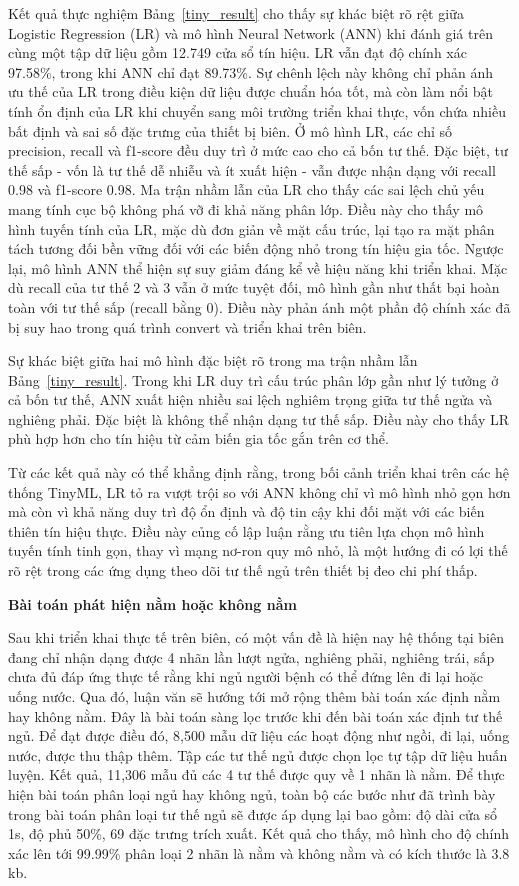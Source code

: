 Kết quả thực nghiệm Bảng~\ref{tiny_result} cho thấy sự khác biệt rõ rệt giữa
Logistic Regression (LR) và mô hình Neural Network (ANN) khi đánh giá trên cùng
một tập dữ liệu gồm 12.749 cửa sổ tín hiệu. LR vẫn đạt độ chính xác 97.58\%,
trong khi ANN chỉ đạt 89.73\%. Sự chênh lệch này không chỉ phản ánh ưu thế của
LR trong điều kiện dữ liệu được chuẩn hóa tốt, mà còn làm nổi bật tính ổn định
của LR khi chuyển sang môi trường triển khai thực, vốn chứa nhiều bất định và
sai số đặc trưng của thiết bị biên. Ở mô hình LR, các chỉ số precision, recall
và f1-score đều duy trì ở mức cao cho cả bốn tư thế. Đặc biệt, tư thế sấp - vốn
là tư thế dễ nhiễu và ít xuất hiện - vẫn được nhận dạng với recall 0.98 và
f1-score 0.98. Ma trận nhầm lẫn của LR cho thấy các sai lệch chủ yếu mang tính
cục bộ không phá vỡ đi khả năng phân lớp. Điều này cho thấy mô hình tuyến tính
của LR, mặc dù đơn giản về mặt cấu trúc, lại tạo ra mặt phân tách tương đối bền
vững đối với các biến động nhỏ trong tín hiệu gia tốc. Ngược lại, mô hình ANN
thể hiện sự suy giảm đáng kể về hiệu năng khi triển khai. Mặc dù recall của tư
thế 2 và 3 vẫn ở mức tuyệt đối, mô hình gần như thất bại hoàn toàn với tư thế
sấp (recall bằng 0). Điều này phản ánh một phần độ chính xác đã bị suy hao
trong quá trình convert và triển khai trên biên.

Sự khác biệt giữa hai mô hình đặc biệt rõ trong ma trận nhầm lẫn
Bảng~\ref{tiny_result}. Trong khi LR duy trì cấu trúc phân lớp gần như lý tưởng
ở cả bốn tư thế, ANN xuất hiện nhiều sai lệch nghiêm trọng giữa tư thế ngửa và
nghiêng phải. Đặc biệt là không thể nhận dạng tư thế sấp. Điều này cho thấy LR
phù hợp hơn cho tín hiệu từ cảm biến gia tốc gắn trên cơ thể.

Từ các kết quả này có thể khẳng định rằng, trong bối cảnh triển khai trên các
hệ thống TinyML, LR tỏ ra vượt trội so với ANN không chỉ vì mô hình nhỏ gọn hơn
mà còn vì khả năng duy trì độ ổn định và độ tin cậy khi đối mặt với các biến
thiên tín hiệu thực. Điều này củng cố lập luận rằng ưu tiên lựa chọn mô hình
tuyến tính tinh gọn, thay vì mạng nơ-ron quy mô nhỏ, là một hướng đi có lợi thế
rõ rệt trong các ứng dụng theo dõi tư thế ngủ trên thiết bị đeo chi phí thấp.

\textbf{Bài toán phát hiện nằm hoặc không nằm}

Sau khi triển khai thực tế trên biên, có một vấn đề là hiện nay hệ thống tại
biên đang chỉ nhận dạng được 4 nhãn lần lượt ngửa, nghiêng phải, nghiêng trái,
sấp chưa đủ đáp ứng thực tế rằng khi ngủ người bệnh có thể đứng lên đi lại hoặc
uống nước. Qua đó, luận văn sẽ hướng tới mở rộng thêm bài toán xác định nằm hay
không nằm. Đây là bài toán sàng lọc trước khi đến bài toán xác định tư thế ngủ.
Để đạt được điều đó, 8,500 mẫu dữ liệu các hoạt động như ngồi, đi lại, uống
nước, được thu thập thêm. Tập các tư thế ngủ được chọn lọc tự tập dữ liệu huấn
luyện. Kết quả, 11,306 mẫu đủ các 4 tư thế được quy về 1 nhãn là nằm. Để thực
hiện bài toán phân loại ngủ hay không ngủ, toàn bộ các bước như đã trình bày
trong bài toán phân loại tư thế ngủ sẽ được áp dụng lại bao gồm: độ dài cửa sổ
1s, độ phủ 50\%, 69 đặc trưng trích xuất. Kết quả cho thấy, mô hình cho độ
chính xác lên tới 99.99\% phân loại 2 nhãn là nằm và không nằm và có kích thước
là 3.8 kb.

